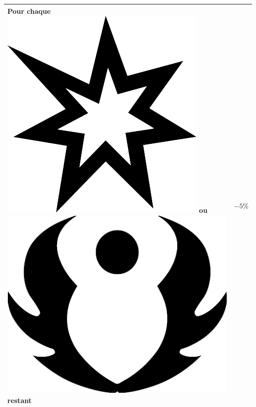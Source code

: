 \documentclass{article}
\begin{document}
\begin{center}
\begin{tabular}[b]{|p{5cm}|p{1cm}|}
		Pour chaque {\Large \includegraphics[height=\fontcharht\font`\B]{../img/result_succes_success}} ou {\Large \includegraphics[height=\fontcharht\font`\B]{../img/result_avantage_advantage}} restant & $-5\%$ \\ 
		\hline 

\end{tabular}
\end{center}
\end{document}
